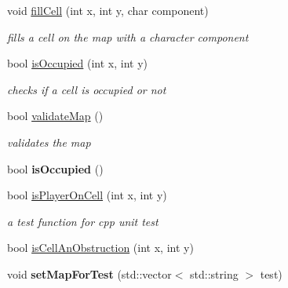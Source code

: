 \begin{DoxyCompactItemize}
void \hyperlink{class_map_editor_engine_a8e791a3027cb744fe72587f0d2521f97}{fill\+Cell} (int x, int y, char component)
\begin{DoxyCompactList}\small\item\em fills a cell on the map with a character component \end{DoxyCompactList}\item 
\hypertarget{class_map_editor_engine_ab06dd22cc63e93a5d773bb8519e893d6}{}\label{class_map_editor_engine_ab06dd22cc63e93a5d773bb8519e893d6} 
bool \hyperlink{class_map_editor_engine_ab06dd22cc63e93a5d773bb8519e893d6}{is\+Occupied} (int x, int y)
\begin{DoxyCompactList}\small\item\em checks if a cell is occupied or not \end{DoxyCompactList}\item 
\hypertarget{class_map_editor_engine_a2c3dc1650663b3fd732204c44a0c6468}{}\label{class_map_editor_engine_a2c3dc1650663b3fd732204c44a0c6468} 
bool \hyperlink{class_map_editor_engine_a2c3dc1650663b3fd732204c44a0c6468}{validate\+Map} ()
\begin{DoxyCompactList}\small\item\em validates the map \end{DoxyCompactList}\item 
\hypertarget{class_map_editor_engine_a72ae16b219adeb12ffc71057769cbf2d}{}\label{class_map_editor_engine_a72ae16b219adeb12ffc71057769cbf2d} 
bool {\bfseries is\+Occupied} ()
\item 
\hypertarget{class_map_editor_engine_a6cb1311e775978847a2e8f3db740def8}{}\label{class_map_editor_engine_a6cb1311e775978847a2e8f3db740def8} 
bool \hyperlink{class_map_editor_engine_a6cb1311e775978847a2e8f3db740def8}{is\+Player\+On\+Cell} (int x, int y)
\begin{DoxyCompactList}\small\item\em a test function for cpp unit test \end{DoxyCompactList}\item 
bool \hyperlink{class_map_editor_engine_aa8f2eec7f99782943317f61e0ff98123}{is\+Cell\+An\+Obstruction} (int x, int y)
\item 
\hypertarget{class_map_editor_engine_abf76a8fa555a228743caae9e5e1ff037}{}\label{class_map_editor_engine_abf76a8fa555a228743caae9e5e1ff037} 
void {\bfseries set\+Map\+For\+Test} (std\+::vector$<$ std\+::string $>$ test)
\item 
\hypertarget{class_map_editor_engine_a4aa53b24a48445df239f7bc343857959}{}\label{class_map_editor_engine_a4aa53b24a48445df239f7bc343857959} 

\end{DoxyCompactItemize}
